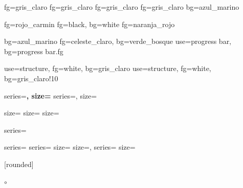 
					{fg=gris_claro}
					{fg=gris_claro}
					{fg=gris_claro}
				{fg=gris_claro}
					{bg=azul_marino}

			{fg=rojo_carmin}
			{fg=black, bg=white}
				{fg=naranja_rojo}

					{bg=azul_marino}
			{fg=celeste_claro, bg=verde_bosque}
	{use=progress bar, bg=progress bar.fg}


			{use=structure, fg=white, bg=gris_claro}
				{use=structure, fg=white, bg=gris_claro!10}



					{series=\bfseries, size=\Large}
				{series=\mdseries, size=\normalsize}

					{size=\small}
					{size=\footnotesize}
				{size=\footnotesize}

			{series=\bfseries}

				{series=\bfseries}
			{series=\mdseries}
				{size=\scriptsize}
				{size=\normalsize, series=\bfseries}
				{size=\normalsize}






[rounded]

		{\textbullet}
		{\textemdash}
	{\ensuremath{\circ}}

